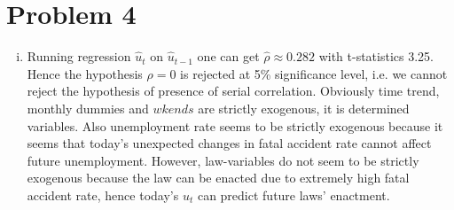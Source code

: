 \documentclass[a4paper]{article}
\begin{document}
\section*{Problem 4}
\begin{enumerate}[(i)]
	\item Running regression $\hat{u}_{t}$ on $\hat{u}_{t-1}$ one can get $\hat{\rho} \approx 0.282$ with t-statistics 3.25. Hence the hypothesis $\rho =0$ is rejected at 5\% significance level, i.e. we cannot reject the hypothesis of presence of serial correlation.
	Obviously time trend, monthly dummies and $wkends$ are strictly exogenous, it is determined variables. Also unemployment rate seems to be strictly exogenous because it seems that today's unexpected changes in fatal accident rate cannot affect future unemployment. However, law-variables do not seem to be strictly exogenous because the law can be enacted due to extremely high fatal accident rate, hence today's $u_t$ can predict future laws' enactment.
	

\end{enumerate}
\end{document}
